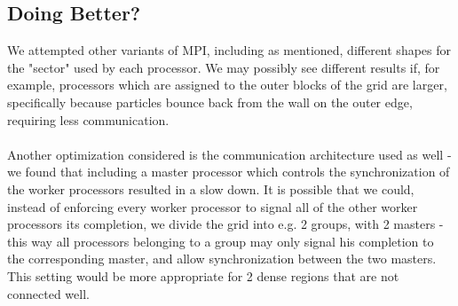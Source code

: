 \documentclass[12pt]{article}
\begin{document}
\subsection{Doing Better?}
We attempted other variants of MPI, including as mentioned, different shapes for the "sector" used by each processor. We may possibly see different results if, for example, processors which are assigned to the outer blocks of the grid are larger, specifically because particles bounce back from the wall on the outer edge, requiring less communication. 
\\ \\
Another optimization considered is the communication architecture used as well - we found that including a master processor which controls the synchronization of the worker processors resulted in a slow down. It is possible that we could, instead of enforcing every worker processor to signal all of the other worker processors its completion, we divide the grid into e.g. 2 groups, with 2 masters - this way all processors belonging to a group may only signal his completion to the corresponding master, and allow synchronization between the two masters. This setting would be more appropriate for 2 dense regions that are not connected well. 
 
\end{document}
